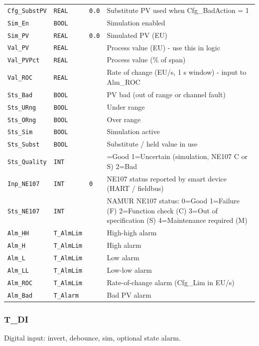 {\begin{longtable}{@{}>{\raggedright\arraybackslash}p{3.4cm}>{\raggedright\arraybackslash}p{3.3cm}>{\raggedright\arraybackslash}p{1.3cm}>{\raggedright\arraybackslash}p{6.4cm}@{}}
\texttt{Cfg\_SubstPV} & \texttt{REAL} & \texttt{0.0} & Substitute PV used when Cfg\_BadAction = 1 \\
\texttt{Sim\_En} & \texttt{BOOL} &  & Simulation enabled \\
\texttt{Sim\_PV} & \texttt{REAL} & \texttt{0.0} & Simulated PV (EU) \\
\texttt{Val\_PV} & \texttt{REAL} &  & Process value (EU) - use this in logic \\
\texttt{Val\_PVPct} & \texttt{REAL} &  & Process value (\% of span) \\
\texttt{Val\_ROC} & \texttt{REAL} &  & Rate of change (EU/\allowbreak{}s, 1 s window) - input to Alm\_ROC \\
\texttt{Sts\_Bad} & \texttt{BOOL} &  & PV bad (out of range or channel fault) \\
\texttt{Sts\_URng} & \texttt{BOOL} &  & Under range \\
\texttt{Sts\_ORng} & \texttt{BOOL} &  & Over range \\
\texttt{Sts\_Sim} & \texttt{BOOL} &  & Simulation active \\
\texttt{Sts\_Subst} & \texttt{BOOL} &  & Substitute /\allowbreak{} held value in use \\
\texttt{Sts\_Quality} & \texttt{INT} &  & 0=Good 1=Uncertain (simulation, NE107 C or S) 2=Bad \\
\texttt{Inp\_NE107} & \texttt{INT} & \texttt{0} & NE107 status reported by smart device (HART /\allowbreak{} fieldbus) \\
\texttt{Sts\_NE107} & \texttt{INT} &  & NAMUR NE107 status: 0=Good 1=Failure (F) 2=Function check (C) 3=Out of specification (S) 4=Maintenance required (M) \\
\texttt{Alm\_HH} & \texttt{T\_AlmLim} &  & High-high alarm \\
\texttt{Alm\_H} & \texttt{T\_AlmLim} &  & High alarm \\
\texttt{Alm\_L} & \texttt{T\_AlmLim} &  & Low alarm \\
\texttt{Alm\_LL} & \texttt{T\_AlmLim} &  & Low-low alarm \\
\texttt{Alm\_ROC} & \texttt{T\_AlmLim} &  & Rate-of-change alarm (Cfg\_Lim in EU/\allowbreak{}s) \\
\texttt{Alm\_Bad} & \texttt{T\_Alarm} &  & Bad PV alarm \\
\bottomrule
\end{longtable}
}
\subsubsection*{T\_DI}
\label{app:pclib:tdi}
Digital input: invert, debounce, sim, optional state alarm.

